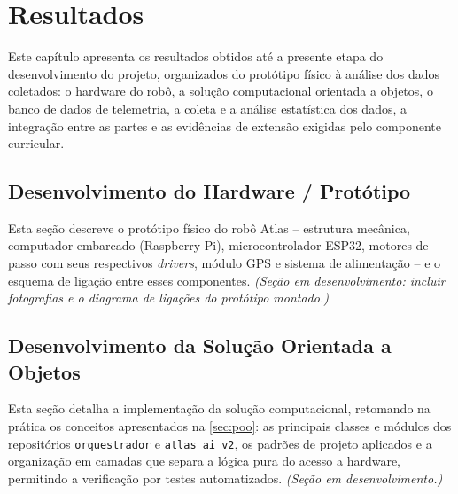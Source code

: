 \chapter{Resultados}\label{chap:Results}

Este capítulo apresenta os resultados obtidos até a presente etapa do desenvolvimento do projeto, organizados do protótipo físico à análise dos dados coletados: o hardware do robô, a solução computacional orientada a objetos, o banco de dados de telemetria, a coleta e a análise estatística dos dados, a integração entre as partes e as evidências de extensão exigidas pelo componente curricular.

\section{Desenvolvimento do Hardware / Protótipo} \label{sec:dev_hardware}
Esta seção descreve o protótipo físico do robô Atlas -- estrutura mecânica, computador embarcado (Raspberry Pi), microcontrolador ESP32, motores de passo com seus respectivos \textit{drivers}, módulo GPS e sistema de alimentação -- e o esquema de ligação entre esses componentes. \textit{(Seção em desenvolvimento: incluir fotografias e o diagrama de ligações do protótipo montado.)}

\section{Desenvolvimento da Solução Orientada a Objetos} \label{sec:dev_software}
Esta seção detalha a implementação da solução computacional, retomando na prática os conceitos apresentados na \autoref{sec:poo}: as principais classes e módulos dos repositórios \texttt{orquestrador} e \texttt{atlas\_ai\_v2}, os padrões de projeto aplicados e a organização em camadas que separa a lógica pura do acesso a hardware, permitindo a verificação por testes automatizados. \textit{(Seção em desenvolvimento.)}

